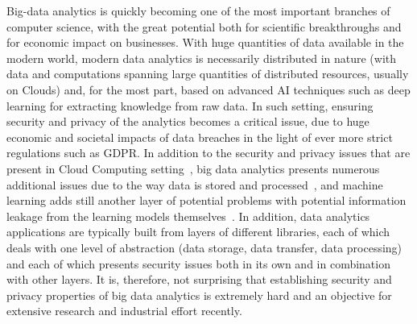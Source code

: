 \documentclass[a4paper,11pt]{article}
\begin{document}
Big-data analytics is quickly becoming one of the most important branches of computer science, with the great potential both for scientific breakthroughs and for economic impact on businesses. With huge quantities of data available in the modern world, modern data analytics is necessarily distributed in nature (with data and computations spanning large quantities of distributed resources, usually on Clouds) and, for the most part, based on advanced AI techniques such as deep learning for extracting knowledge from raw data. In such setting, ensuring security and privacy of the analytics becomes a critical issue, due to huge economic and societal impacts of data breaches in the light of ever more strict regulations such as GDPR. In addition to the security and privacy issues that are present in Cloud Computing setting~\cite{cloudSecurity}, big data analytics presents numerous additional issues due to the way data is stored and processed~\cite{bigdataSecurity}, and machine learning adds still another layer of potential problems with potential information leakage from the learning models themselves~\cite{mlSecurity}. In addition, data analytics applications are typically built from layers of different libraries, each of which deals with one level of abstraction (data storage, data transfer, data processing) and each of which presents security issues both in its own and in combination with other layers. It is, therefore, not surprising that establishing security and privacy properties of big data analytics is extremely hard and an objective for extensive research and industrial effort recently.
\end{document}
